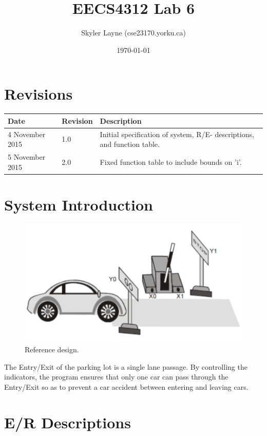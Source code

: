 \documentclass[fontsize=12pt,paper=letter,twoside]{scrartcl}
\title{EECS4312 Lab 6}
\author{Skyler Layne (cse23170\@cse.yorku.ca)}
\date{\today} %
\begin{document}
\maketitle

\section*{Revisions}

\begin{tabular}{|l|l|p{3in}|}
\hline
Date & Revision& Description \\ 
\hline
4 November  2015
& 1.0       
& Initial specification of system, R/E- descriptions, and function table.\\ 
\hline
5 November  2015
& 2.0       
& Fixed function table to include bounds on 'i'. \\ 
\hline
\end{tabular}
\newpage
\tableofcontents
\newpage


%

\section{System Introduction}
\begin{figure}
\center
\includegraphics[width=.7\textwidth]{system.png}
\caption{Reference design.}
\end{figure}
{The Entry/Exit of the parking lot is a single lane passage. By controlling the indicators, the program ensures that only one car can pass through the Entry/Exit so as to prevent a car accident between entering and leaving cars.}\\

\newpage
\section{E/R Descriptions}
\end{document}
